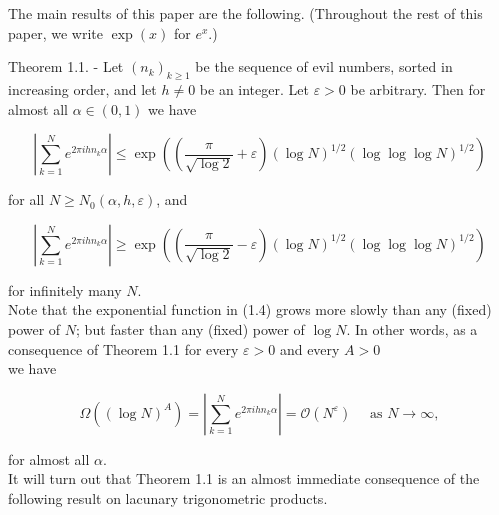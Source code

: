 \documentclass[10pt]{article}
\begin{document}
The main results of this paper are the following. (Throughout the rest of this paper, we write $\exp (x)$ for $e^{x}$.)

Theorem 1.1. - Let $\left(n_{k}\right)_{k \geqslant 1}$ be the sequence of evil numbers, sorted in increasing order, and let $h \neq 0$ be an integer. Let $\varepsilon>0$ be arbitrary. Then for almost all $\alpha \in(0,1)$ we have


\begin{equation*}
\left|\sum_{k=1}^{N} e^{2 \pi i h n_{k} \alpha}\right| \leqslant \exp \left(\left(\frac{\pi}{\sqrt{\log 2}}+\varepsilon\right)(\log N)^{1 / 2}(\log \log \log N)^{1 / 2}\right) \tag{1.4}
\end{equation*}


for all $N \geqslant N_{0}(\alpha, h, \varepsilon)$, and


\begin{equation*}
\left|\sum_{k=1}^{N} e^{2 \pi i h n_{k} \alpha}\right| \geqslant \exp \left(\left(\frac{\pi}{\sqrt{\log 2}}-\varepsilon\right)(\log N)^{1 / 2}(\log \log \log N)^{1 / 2}\right) \tag{1.5}
\end{equation*}


for infinitely many $N$.\\
Note that the exponential function in (1.4) grows more slowly than any (fixed) power of $N$; but faster than any (fixed) power of $\log N$. In other words, as a consequence of Theorem 1.1 for every $\varepsilon>0$ and every $A>0$\\
we have

$$
\Omega\left((\log N)^{A}\right)=\left|\sum_{k=1}^{N} e^{2 \pi i h n_{k} \alpha}\right|=\mathcal{O}\left(N^{\varepsilon}\right) \quad \text { as } N \rightarrow \infty,
$$

for almost all $\alpha$.\\
It will turn out that Theorem 1.1 is an almost immediate consequence of the following result on lacunary trigonometric products.
\end{document}
